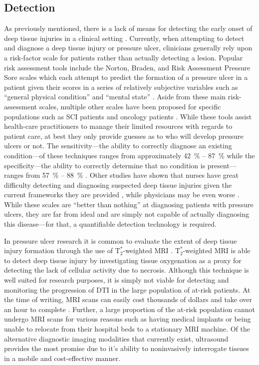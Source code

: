 		\subsection{Detection}
			As previously mentioned, there is a lack of means for detecting the early onset of deep tissue injuries in a clinical setting \cite{gunningberg08,milne09}. Currently, when attempting to detect and diagnose a deep tissue injury or pressure ulcer, clinicians generally rely upon a risk-factor scale for patients rather than actually detecting a lesion. Popular risk assessment tools include the Norton, Braden, and Risk Assessment Pressure Sore scales which each attempt to predict the formation of a pressure ulcer in a patient given their scores in a series of relatively subjective variables such as ``general physical condition'' and ``mental state'' \cite{norton63,braden94,lindgren02}. Aside from these main risk-assessment scales, multiple other scales have been proposed for specific populations such as SCI patients \cite{salzberg96} and oncology patients \cite{fromantin11}. While these tools assist health-care practitioners to manage their limited resources with regards to patient care, at best they only provide guesses as to who will develop pressure ulcers or not. The sensitivity---the ability to correctly diagnose an existing condition---of these techniques ranges from approximately \SI{42}{\percent} -- \SI{87}{\percent} while the specificity---the ability to correctly determine that no condition is present---ranges from \SI{57}{\percent} -- \SI{88}{\percent} \cite{kallman14}. Other studies have shown that nurses have great difficulty detecting and diagnosing suspected deep tissue injuries given the current frameworks they are provided \cite{lee13}, while physicians may be even worse \cite{levine12}. While these scales are ``better than nothing'' at diagnosing patients with pressure ulcers, they are far from ideal and are simply not capable of actually diagnosing this disease---for that, a quantifiable detection technology is required.

			In pressure ulcer research it is common to evaluate the extent of deep tissue injury formation through the use of $\mathrm{T}_2^*$-weighted MRI \cite{loerakker11,stekelenburg06,solis12-03}. $\mathrm{T}_2^*$-weighted MRI is able to detect deep tissue injury by investigating tissue oxygenation as a proxy for detecting the lack of cellular activity due to necrosis. Although this technique is well suited for research purposes, it is simply not viable for detecting and monitoring the progression of DTI in the large population of at-risk patients. At the time of writing, MRI scans can easily cost thousands of dollars and take over an hour to complete \cite{wardlaw14,schulthess14,johnson14}. Further, a large proportion of the at-risk population cannot undergo MRI scans for various reasons such as having medical implants or being unable to relocate from their hospital beds to a stationary MRI machine. Of the alternative diagnostic imaging modalities that currently exist, ultrasound provides the most promise due to it's ability to noninvasively interrogate tissues in a mobile and cost-effective manner.

